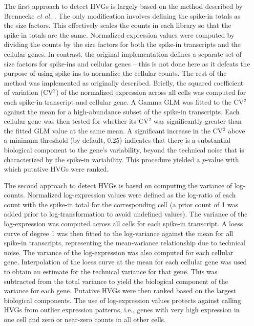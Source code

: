 \documentclass{article}
\begin{document}
The first approach to detect HVGs is largely based on the method described by Brennecke \textit{et al.} \cite{brennecke2013accounting}.
The only modification involves defining the spike-in totals as the size factors.
This effectively scales the counts in each library so that the spike-in totals are the same.
Normalized expression values were computed by dividing the counts by the size factors for both the spike-in transcripts and the cellular genes.
In contrast, the original implementation defines a separate set of size factors for spike-ins and cellular genes -- this is not done here as it defeats the purpose of using spike-ins to normalize the cellular counts.
The rest of the method was implemented as originally described.
Briefly, the squared coefficient of variation (CV$^2$) of the normalized expression across all cells was computed for each spike-in transcript and cellular gene.
A Gamma GLM was fitted to the CV$^2$ against the mean for a high-abundance subset of the spike-in transcripts.
Each cellular gene was then tested for whether its CV$^2$ was significantly greater than the fitted GLM value at the same mean.
A significant increase in the CV$^2$ above a minimum threshold (by default, 0.25) indicates that there is a substantial biological component to the gene's variability, beyond the technical noise that is characterized by the spike-in variability.
This procedure yielded a $p$-value with which putative HVGs were ranked.

The second approach to detect HVGs is based on computing the variance of log-counts.
Normalized log-expression values were defined as the log-ratio of each count with the spike-in total for the corresponding cell
    (a prior count of 1 was added prior to log-transformation to avoid undefined values).
The variance of the log-expression was computed across all cells for each spike-in transcript.
A loess curve of degree 1 was then fitted to the log-variance against the mean for all spike-in transcripts, representing the mean-variance relationship due to technical noise.
The variance of the log-expression was also computed for each cellular gene.
Interpolation of the loess curve at the mean for each cellular gene was used to obtain an estimate for the technical variance for that gene.
This was subtracted from the total variance to yield the biological component of the variance for each gene.
Putative HVGs were then ranked based on the largest biological components.
The use of log-expression values protects against calling HVGs from outlier expression patterns, i.e., genes with very high expression in one cell and zero or near-zero counts in all other cells.
\end{document}
